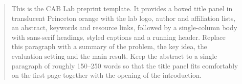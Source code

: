 \begin{abstract}
This is the CAB Lab preprint template. It provides a boxed title panel in translucent Princeton orange with the lab logo, author and affiliation lists, an abstract, keywords and resource links, followed by a single-column body with sans-serif headings, styled captions and a running header. Replace this paragraph with a summary of the problem, the key idea, the evaluation setting and the main result. Keep the abstract to a single paragraph of roughly 150--250 words so that the title panel fits comfortably on the first page together with the opening of the introduction.
\end{abstract}

